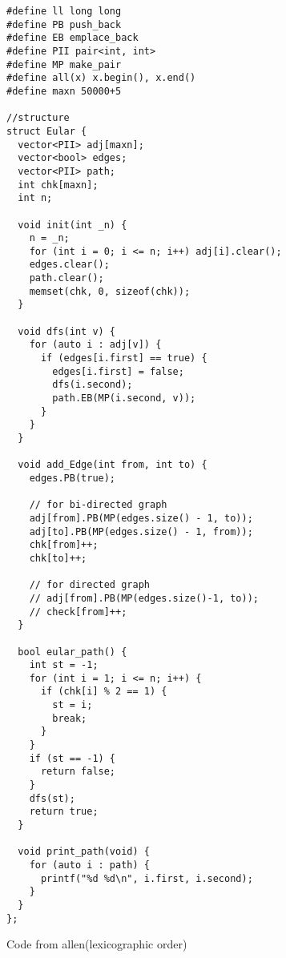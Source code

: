 \begin{lstlisting}
#define ll long long
#define PB push_back
#define EB emplace_back
#define PII pair<int, int>
#define MP make_pair
#define all(x) x.begin(), x.end()
#define maxn 50000+5
  
//structure
struct Eular {
  vector<PII> adj[maxn];
  vector<bool> edges;
  vector<PII> path;
  int chk[maxn];
  int n;

  void init(int _n) {
    n = _n;
    for (int i = 0; i <= n; i++) adj[i].clear();
    edges.clear();
    path.clear();
    memset(chk, 0, sizeof(chk));
  }

  void dfs(int v) {
    for (auto i : adj[v]) {
      if (edges[i.first] == true) {
        edges[i.first] = false;
        dfs(i.second);
        path.EB(MP(i.second, v));
      }
    }
  }

  void add_Edge(int from, int to) {
    edges.PB(true);

    // for bi-directed graph
    adj[from].PB(MP(edges.size() - 1, to));
    adj[to].PB(MP(edges.size() - 1, from));
    chk[from]++;
    chk[to]++;

    // for directed graph
    // adj[from].PB(MP(edges.size()-1, to));
    // check[from]++;
  }

  bool eular_path() {
    int st = -1;
    for (int i = 1; i <= n; i++) {
      if (chk[i] % 2 == 1) {
        st = i;
        break;
      }
    }
    if (st == -1) {
      return false;
    }
    dfs(st);
    return true;
  }

  void print_path(void) {
    for (auto i : path) {
      printf("%d %d\n", i.first, i.second);
    }
  }
};
\end{lstlisting}

Code from allen(lexicographic order)

